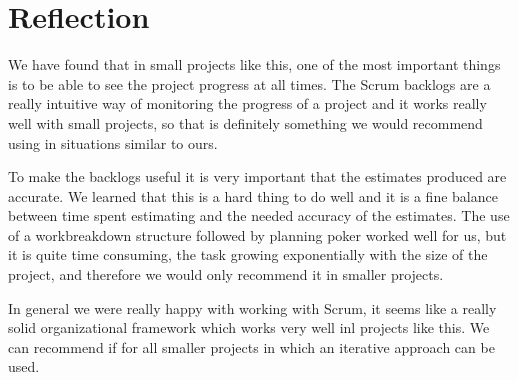 \section{Reflection}

We have found that in small projects like this, one of the most important
things is to be able to see the project progress at all times. The Scrum
backlogs are a really intuitive way of monitoring the progress of a project and
it works really well with small projects, so that is definitely something we
would recommend using in situations similar to ours.

To make the backlogs useful it is very important that the estimates produced
are accurate. We learned that this is a hard thing to do well and it is a fine
balance between time spent estimating and the needed accuracy of the estimates.
The use of a workbreakdown structure followed by planning poker worked well for
us, but it is quite time consuming, the task growing exponentially with the
size of the project, and therefore we would only recommend it in smaller
projects.

In general we were really happy with working with Scrum, it seems like a really
solid organizational framework which works very well inl projects like this. We
can recommend if for all smaller projects in which an iterative approach can be
used. 
